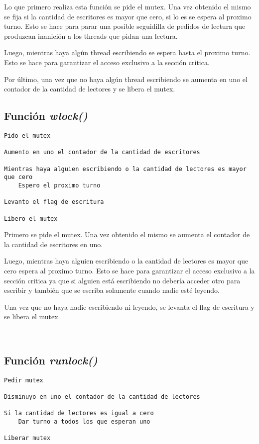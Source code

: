Lo que primero realiza esta función se pide el mutex. Una vez obtenido el mismo se fija si la cantidad de escritores es mayor que cero, si lo es se espera al proximo turno. Esto se hace para parar una posible seguidilla de pedidos de lectura que produzcan inanición a los threads que pidan una lectura.

Luego, mientras haya algún thread escribiendo se espera hasta el proximo turno. Esto se hace para garantizar el acceso exclusivo a la sección critica.

Por último, una vez que no haya algún thread escribiendo se aumenta en uno el contador de la cantidad de lectores y se libera el mutex.

\newpage

\subsection{Función \textit{wlock()}}

\begin{lstlisting}
Pido el mutex

Aumento en uno el contador de la cantidad de escritores

Mientras haya alguien escribiendo o la cantidad de lectores es mayor que cero
	Espero el proximo turno

Levanto el flag de escritura

Libero el mutex
\end{lstlisting}

Primero se pide el mutex. Una vez obtenido el mismo se aumenta el contador de la cantidad de escritores en uno.

Luego, mientras haya alguien escribiendo o la cantidad de lectores es mayor que cero espera al proximo turno. Esto se hace para garantizar el acceso exclusivo a la sección critica ya que si alguien está escribiendo no debería acceder otro para escribir y también que se escriba solamente cuando nadie esté leyendo.

Una vez que no haya nadie escribiendo ni leyendo, se levanta el flag de escritura y se libera el mutex.

~
\subsection{Función \textit{runlock()}}

\begin{lstlisting}
Pedir mutex

Disminuyo en uno el contador de la cantidad de lectores

Si la cantidad de lectores es igual a cero
	Dar turno a todos los que esperan uno

Liberar mutex
\end{lstlisting}

